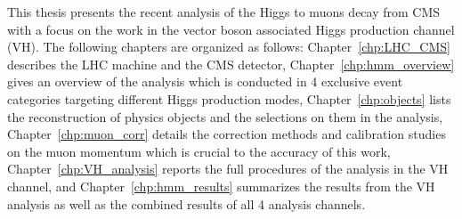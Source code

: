 This thesis presents the recent analysis of the Higgs to muons decay from CMS 
with a focus on the work in the vector boson associated Higgs production channel (VH).
The following chapters are organized as follows:
Chapter~\ref{chp:LHC_CMS} describes the LHC machine and the CMS detector,
Chapter~\ref{chp:hmm_overview} gives an overview of the \hmm analysis 
which is conducted in 4 exclusive event categories targeting different Higgs production modes,
Chapter~\ref{chp:objects} lists the reconstruction of physics objects and the selections on them in the analysis,
Chapter~\ref{chp:muon_corr} details the correction methods and calibration studies on the muon momentum which is crucial to the accuracy of this work,
Chapter~\ref{chp:VH_analysis} reports the full procedures of the analysis in the VH channel,
and Chapter~\ref{chp:hmm_results} summarizes the results from the VH analysis 
as well as the combined results of all 4 analysis channels. 